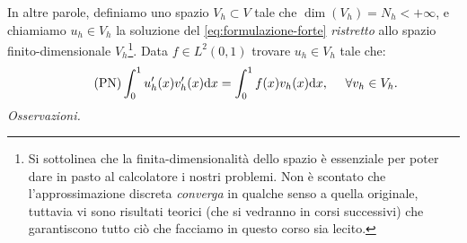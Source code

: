 In altre parole, definiamo uno spazio $\displaystyle V_{h} \subset V$ tale che $\displaystyle \operatorname{dim}( V_{h}) =N_{h} < +\infty $, e chiamiamo $\displaystyle u_{h} \in V_{h}$ la soluzione del \eqref{eq:formulazione-forte} \textit{ristretto} allo spazio finito-dimensionale $\displaystyle V_{h}$\footnote{Si sottolinea che la finita-dimensionalità dello spazio è essenziale per poter dare in pasto al calcolatore i nostri problemi. Non è scontato che l'approssimazione discreta \textit{converga} in qualche senso a quella originale, tuttavia vi sono risultati teorici (che si vedranno in corsi successivi) che garantiscono tutto ciò che facciamo in questo corso sia lecito.}. Data $f \in L^{2}(0,1)$ trovare $u_h \in V_h$ tale che:
\begin{equation}\tag{PN}
	\int\nolimits ^{1}_{0} u'_{h}(x) v'_{h}(x) \mathrm d x=\int\nolimits ^{1}_{0} f(x) v_{h}(x) \mathrm d x,\ \ \ \ \forall v_{h} \in V_{h}.
	\label{eq:problema-numerico}
\end{equation}
\textit{Osservazioni.}
